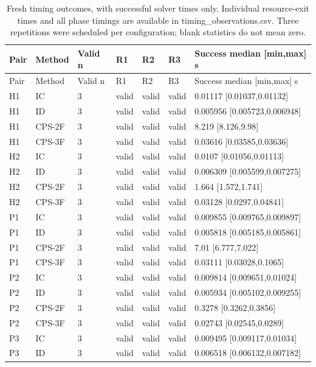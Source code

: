 \begingroup
\small
\begin{longtable}{lllllll}
\caption{Fresh timing outcomes, with successful solver times only. Individual resource-exit times and all phase timings are available in timing\_observations.csv. Three repetitions were scheduled per configuration; blank statistics do not mean zero.}\label{tab:timing}\\
\toprule
Pair & Method & Valid n & R1 & R2 & R3 & Success median [min,max] s \\
\midrule
\endfirsthead
\toprule
Pair & Method & Valid n & R1 & R2 & R3 & Success median [min,max] s \\
\midrule
\endhead
H1 & IC & 3 & valid & valid & valid & 0.01117 [0.01037,0.01132] \\
H1 & ID & 3 & valid & valid & valid & 0.005956 [0.005723,0.006948] \\
H1 & CPS-2F & 3 & valid & valid & valid & 8.219 [8.126,9.98] \\
H1 & CPS-3F & 3 & valid & valid & valid & 0.03616 [0.03585,0.03636] \\
H2 & IC & 3 & valid & valid & valid & 0.0107 [0.01056,0.01113] \\
H2 & ID & 3 & valid & valid & valid & 0.006309 [0.005599,0.007275] \\
H2 & CPS-2F & 3 & valid & valid & valid & 1.664 [1.572,1.741] \\
H2 & CPS-3F & 3 & valid & valid & valid & 0.03128 [0.0297,0.04841] \\
P1 & IC & 3 & valid & valid & valid & 0.009855 [0.009765,0.009897] \\
P1 & ID & 3 & valid & valid & valid & 0.005818 [0.005185,0.005861] \\
P1 & CPS-2F & 3 & valid & valid & valid & 7.01 [6.777,7.022] \\
P1 & CPS-3F & 3 & valid & valid & valid & 0.03111 [0.03028,0.1065] \\
P2 & IC & 3 & valid & valid & valid & 0.009814 [0.009651,0.01024] \\
P2 & ID & 3 & valid & valid & valid & 0.005934 [0.005102,0.009255] \\
P2 & CPS-2F & 3 & valid & valid & valid & 0.3278 [0.3262,0.3856] \\
P2 & CPS-3F & 3 & valid & valid & valid & 0.02743 [0.02545,0.0289] \\
P3 & IC & 3 & valid & valid & valid & 0.009495 [0.009117,0.01034] \\
P3 & ID & 3 & valid & valid & valid & 0.006518 [0.006132,0.007182] \\

\end{longtable}

